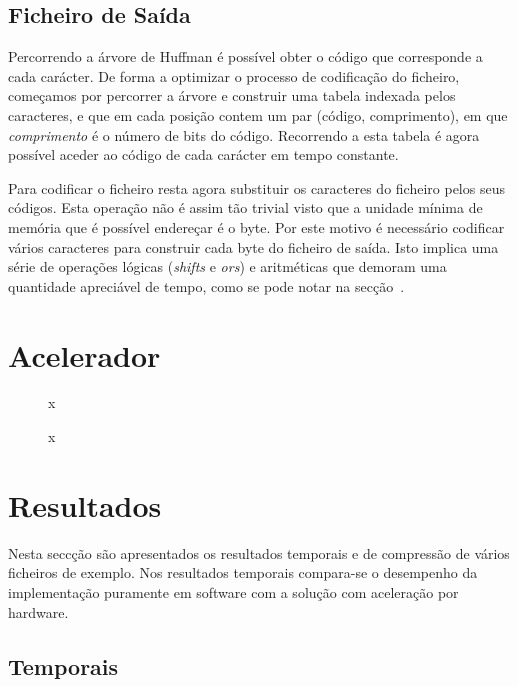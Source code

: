 \documentclass[a4paper]{article}
\begin{document}
	\subsection{Ficheiro de Saída}
	
	Percorrendo a árvore de Huffman é possível obter o código que corresponde a cada carácter. De forma a optimizar o processo de codificação do ficheiro, começamos por percorrer a árvore e construir uma tabela indexada pelos caracteres, e que em cada posição contem um par (código, comprimento), em que \emph{comprimento} é o número de bits do código. Recorrendo a esta tabela é agora possível aceder ao código de cada carácter em tempo constante.
	
	Para codificar o ficheiro resta agora substituir os caracteres do ficheiro pelos seus códigos. Esta operação não é assim tão trivial visto que a unidade mínima de memória que é possível endereçar é o byte. Por este motivo é necessário codificar vários caracteres para construir cada byte do ficheiro de saída. Isto implica uma série de operações lógicas (\textit{shifts} e \textit{ors}) e aritméticas que demoram uma quantidade apreciável de tempo, como se pode notar na secção~.
	
	
	
	\section{Acelerador}
	\label{sec:accelerator}
	
	\begin{figure}[h]
		\centering
		\caption{x}
		\label{fig:hw_datapath}
	\end{figure}
	
	
	\begin{figure}[h]
		\centering
		\caption{x}
		\label{fig:hw_fsm}
	\end{figure}	
	
	
	
	\section{Resultados}
	\label{sec:results}

	Nesta seccção são apresentados os resultados temporais e de compressão de vários ficheiros de exemplo. Nos resultados temporais compara-se o desempenho da implementação puramente em software com a solução com aceleração por hardware.
	
	\subsection{Temporais}
	
\end{document}
